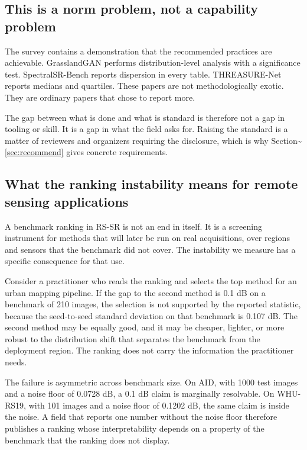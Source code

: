 \documentclass{interact}
\begin{document}
\subsection{This is a norm problem, not a capability problem}\label{sec:norm}

The survey contains a demonstration that the recommended practices are achievable. GrasslandGAN performs distribution-level analysis with a significance test. SpectralSR-Bench reports dispersion in every table. THREASURE-Net reports medians and quartiles. These papers are not methodologically exotic. They are ordinary papers that chose to report more.

The gap between what is done and what is standard is therefore not a gap in tooling or skill. It is a gap in what the field asks for. Raising the standard is a matter of reviewers and organizers requiring the disclosure, which is why Section\textasciitilde{}\ref{sec:recommend} gives concrete requirements.

\subsection{What the ranking instability means for remote sensing applications}\label{sec:applications}

A benchmark ranking in RS-SR is not an end in itself. It is a screening instrument for methods that will later be run on real acquisitions, over regions and sensors that the benchmark did not cover. The instability we measure has a specific consequence for that use.

Consider a practitioner who reads the ranking and selects the top method for an urban mapping pipeline. If the gap to the second method is 0.1 dB on a benchmark of 210 images, the selection is not supported by the reported statistic, because the seed-to-seed standard deviation on that benchmark is 0.107 dB. The second method may be equally good, and it may be cheaper, lighter, or more robust to the distribution shift that separates the benchmark from the deployment region. The ranking does not carry the information the practitioner needs.

The failure is asymmetric across benchmark size. On AID, with 1000 test images and a noise floor of 0.0728 dB, a 0.1 dB claim is marginally resolvable. On WHU-RS19, with 101 images and a noise floor of 0.1202 dB, the same claim is inside the noise. A field that reports one number without the noise floor therefore publishes a ranking whose interpretability depends on a property of the benchmark that the ranking does not display.
\end{document}
